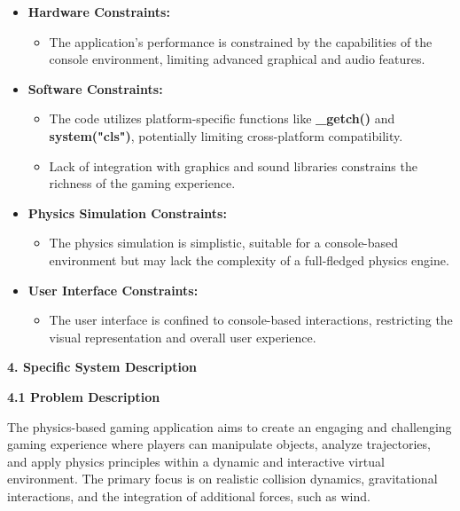 \documentclass[
]{article}
\begin{document}
\begin{itemize}
\item
  \textbf{Hardware Constraints:}

  \begin{itemize}
  \item
    The application's performance is constrained by the capabilities of
    the console environment, limiting advanced graphical and audio
    features.
  \end{itemize}
\item
  \textbf{Software Constraints:}

  \begin{itemize}
  \item
    The code utilizes platform-specific functions like
    \textbf{\_getch()} and \textbf{system("cls")}, potentially limiting
    cross-platform compatibility.
  \item
    Lack of integration with graphics and sound libraries constrains the
    richness of the gaming experience.
  \end{itemize}
\item
  \textbf{Physics Simulation Constraints:}

  \begin{itemize}
  \item
    The physics simulation is simplistic, suitable for a console-based
    environment but may lack the complexity of a full-fledged physics
    engine.
  \end{itemize}
\item
  \textbf{User Interface Constraints:}

  \begin{itemize}
  \item
    The user interface is confined to console-based interactions,
    restricting the visual representation and overall user experience.
  \end{itemize}
\end{itemize}

\textbf{4. Specific System Description}

\textbf{4.1 Problem Description}

The physics-based gaming application aims to create an engaging and
challenging gaming experience where players can manipulate objects,
analyze trajectories, and apply physics principles within a dynamic and
interactive virtual environment. The primary focus is on realistic
collision dynamics, gravitational interactions, and the integration of
additional forces, such as wind.
\end{document}
